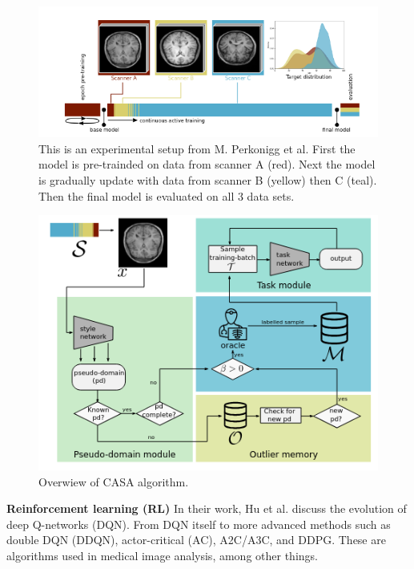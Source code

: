\documentclass{IEEEcsmag}
\begin{document}
    \begin{figure}
        \centering
        \includegraphics[width=\linewidth]{images/Cite-10-img-2.png}
        \caption{This is an experimental setup from M. Perkonigg et al\cite{cite-10}.
        First the model is pre-trainded on data from scanner A (red).
        Next the model is  gradually update with data from scanner B (yellow) then C (teal).
        Then the final model is evaluated on all 3 data sets. }
        \label{fig:Cite-10-img-2}
    \end{figure}
    \begin{figure}
        \centering
        \includegraphics[width=\linewidth]{images/Cite-10-img-1.png}
        \caption{Overwiew of CASA algorithm\cite{cite-10}.}
        \label{fig:Cite-10-img-2b}
    \end{figure}
    \textbf{Reinforcement learning (RL)} In their work, Hu et al. discuss the evolution of deep Q-networks (DQN).
    From DQN itself to more advanced methods such as double DQN (DDQN), actor-critical (AC), A2C/A3C, and DDPG.
    These are algorithms used in medical image analysis, among other things.
\end{document}
